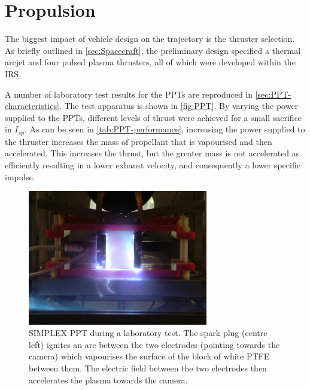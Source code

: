 
\section{Propulsion} \label{sec:Propulsion}

The biggest impact of vehicle design on the trajectory is the thruster selection. As briefly outlined in \autoref{sec:Spacecraft}, the preliminary design specified a thermal arcjet and four pulsed plasma thrusters, all of which were developed within the IRS. 

A number of laboratory test results for the PPTs are reproduced in \autoref{sec:PPT-characteristics}. The test apparatus is shown in \autoref{fig:PPT}. By varying the power supplied to the PPTs, different levels of thrust were achieved for a small sacrifice in $I_{sp}$. As can be seen in \autoref{tab:PPT-performance}, increasing the power supplied to the thruster increases the mass of propellant that is vapourised and then accelerated. This increases the thrust, but the greater mass is not accelerated as efficiently resulting in a lower exhaust velocity, and consequently a lower specific impulse. 

\begin{figure}
\caption{SIMPLEX PPT during a laboratory test. The spark plug (centre left) ignites an arc between the two electrodes (pointing towards the camera) which vapourises the surface of the block of white PTFE between them. The electric field between the two electrodes then accelerates the plasma towards the camera.}
\label{fig:PPT}
\centering
\includegraphics[width=0.7\textwidth]{Images/PPT_test.JPG}
\end{figure}

